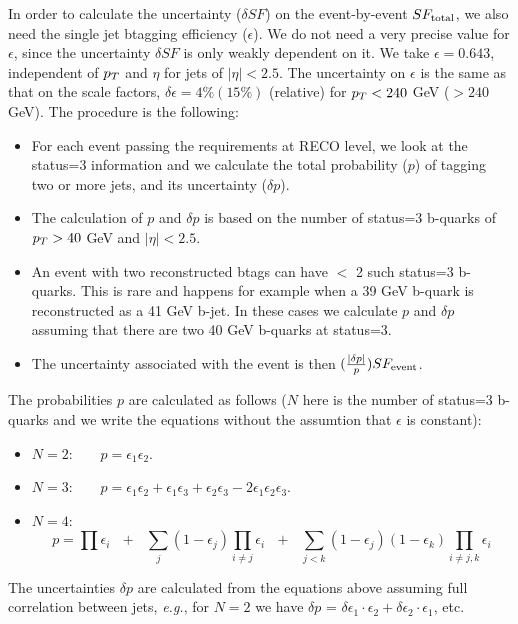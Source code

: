 In order to calculate the uncertainty ($\delta SF$) on the event-by-event $SF_{\rm total}$,
we also need the single jet btagging efficiency ($\epsilon$).  
We do not need a very precise value for $\epsilon$, since the uncertainty $\delta SF$ is 
only weakly dependent on it.  We take $\epsilon = 0.643$, independent of $p_T$
and $\eta$ for jets of $|\eta| < 2.5$.  The uncertainty on $\epsilon$ is 
the same as that on the scale factors, $\delta \epsilon = 4\% (15\%)$ (relative)
for $p_T < 240$ GeV ($> 240$ GeV).
The procedure is the following:
\begin{itemize}

\item For each event passing the requirements at RECO level, we look at the status=3 information
and we calculate the total probability ($p$) of tagging two or more jets, and 
its uncertainty ($\delta p$).

\item The calculation of $p$ and $\delta p$ is based on the number of status=3 b-quarks
of $p_T > 40$ GeV and $|\eta| < 2.5$.  

\item An event with two reconstructed btags can have $<$ 2 such status=3 b-quarks.  This 
is rare and happens for example when a 39 GeV b-quark is reconstructed as a 41 GeV
b-jet.  In these cases we calculate $p$ and $\delta p$ assuming that there are 
two 40 GeV b-quarks at status=3.

\item The uncertainty associated with the event is then $(\frac{|\delta p|}{p}) SF_{\rm event}$.

\end{itemize}

The probabilities $p$ are calculated as follows ($N$ here is the number of status=3 b-quarks
and we write the equations without the assumtion that $\epsilon$ is constant):

\begin{itemize}

\item $N=2$:~~~~$p = \epsilon_1 \epsilon_2$.

\item $N=3$:~~~~$p = \epsilon_1 \epsilon_2 + \epsilon_1 \epsilon_3 + \epsilon_2 \epsilon_3 -
2\epsilon_1 \epsilon_2 \epsilon_3$.

\item $N=4$:~~~~$$p = \prod{\epsilon_i}~~~+~~~\sum_j{(1-\epsilon_j)\prod_{i \ne j}{\epsilon_i}}
~~~+~~~\sum_{j<k}{(1-\epsilon_j)(1-\epsilon_k)\prod_{i \ne j,k}{\epsilon_i}}$$



\end{itemize}

The uncertainties $\delta p$ are calculated from the equations above assuming full 
correlation between jets, {\em e.g.}, for $N=2$ we have 
$\delta p$ = $\delta \epsilon_1 \cdot \epsilon_2 + \delta \epsilon_2 \cdot \epsilon_1$, etc.


